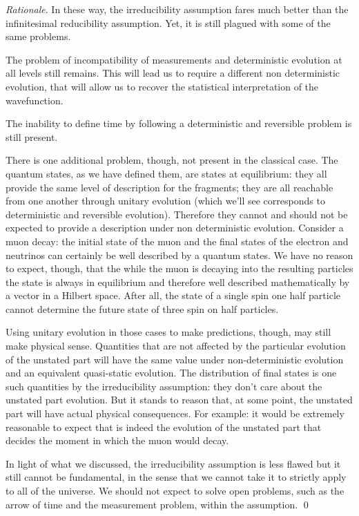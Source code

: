 \documentclass[aps,pra,10pt,twocolumn,floatfix,nofootinbib]{revtex4-1}
\numberwithin{equation}{section}
\theoremstyle{definition}
\newenvironment{rationale}{\emph{Rationale}.}{\qed}
\begin{document}
\begin{rationale}
	In these way, the irreducibility assumption fares much better than the infinitesimal reducibility assumption. Yet, it is still plagued with some of the same problems.
	
	The problem of incompatibility of measurements and deterministic evolution at all levels still remains. This will lead us to require a different non deterministic evolution, that will allow us to recover the statistical interpretation of the wavefunction.
	
	The inability to define time by following a deterministic and reversible problem is still present.
	
	There is one additional problem, though, not present in the classical case. The quantum states, as we have defined them, are states at equilibrium: they all provide the same level of description for the fragments; they are all reachable from one another through unitary evolution (which we'll see corresponds to deterministic and reversible evolution). Therefore they cannot and should not be expected to provide a description under non deterministic evolution. Consider a muon decay: the initial state of the muon and the final states of the electron and neutrinos can certainly be well described by a quantum states. We have no reason to expect, though, that the while the muon is decaying into the resulting particles the state is always in equilibrium and therefore well described mathematically by a vector in a Hilbert space. After all, the state of a single spin one half particle cannot determine the future state of three spin on half particles.
	
	Using unitary evolution in those cases to make predictions, though, may still make physical sense. Quantities that are not affected by the particular evolution of the unstated part will have the same value under non-deterministic evolution and an equivalent quasi-static evolution. The distribution of final states is one such quantities by the irreducibility assumption: they don't care about the unstated part evolution. But it stands to reason that, at some point, the unstated part will have actual physical consequences. For example: it would be extremely reasonable to expect that is indeed the evolution of the unstated part that decides the moment in which the muon would decay.
	
	In light of what we discussed, the irreducibility assumption is less flawed but it still cannot be fundamental, in the sense that we cannot take it to strictly apply to all of the universe. We should not expect to solve open problems, such as the arrow of time and the measurement problem, within the assumption.
\end{rationale}
\end{document}
